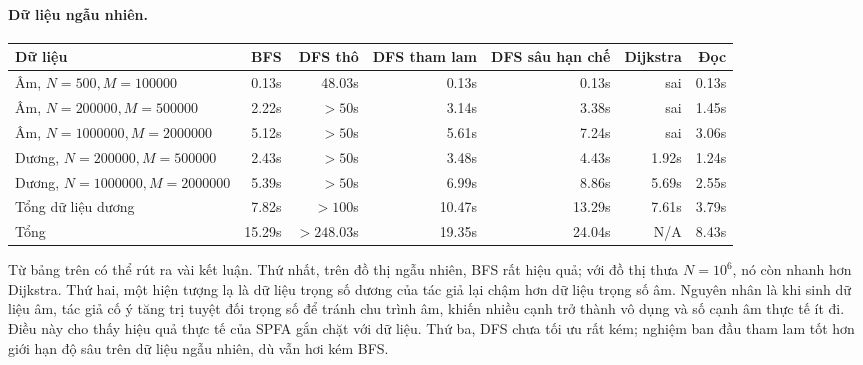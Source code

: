 \documentclass[11pt]{article}
\begin{document}
\paragraph{Dữ liệu ngẫu nhiên.}
\begin{center}
\scriptsize
\begin{tabular}{|l|r|r|r|r|r|r|}
\hline
Dữ liệu & BFS & DFS thô & DFS tham lam & DFS sâu hạn chế & Dijkstra & Đọc \\
\hline
Âm, \(N=500,M=100000\) & 0.13s & 48.03s & 0.13s & 0.13s & sai & 0.13s \\
Âm, \(N=200000,M=500000\) & 2.22s & \(>50\)s & 3.14s & 3.38s & sai & 1.45s \\
Âm, \(N=1000000,M=2000000\) & 5.12s & \(>50\)s & 5.61s & 7.24s & sai & 3.06s \\
Dương, \(N=200000,M=500000\) & 2.43s & \(>50\)s & 3.48s & 4.43s & 1.92s & 1.24s \\
Dương, \(N=1000000,M=2000000\) & 5.39s & \(>50\)s & 6.99s & 8.86s & 5.69s & 2.55s \\
Tổng dữ liệu dương & 7.82s & \(>100\)s & 10.47s & 13.29s & 7.61s & 3.79s \\
Tổng & 15.29s & \(>248.03\)s & 19.35s & 24.04s & N/A & 8.43s \\
\hline
\end{tabular}
\end{center}

Từ bảng trên có thể rút ra vài kết luận. Thứ nhất, trên đồ thị ngẫu nhiên,
BFS rất hiệu quả; với đồ thị thưa \(N=10^6\), nó còn nhanh hơn Dijkstra. Thứ
hai, một hiện tượng lạ là dữ liệu trọng số dương của tác giả lại chậm hơn dữ
liệu trọng số âm. Nguyên nhân là khi sinh dữ liệu âm, tác giả cố ý tăng trị
tuyệt đối trọng số để tránh chu trình âm, khiến nhiều cạnh trở thành vô dụng
và số cạnh âm thực tế ít đi. Điều này cho thấy hiệu quả thực tế của SPFA gắn
chặt với dữ liệu. Thứ ba, DFS chưa tối ưu rất kém; nghiệm ban đầu tham lam
tốt hơn giới hạn độ sâu trên dữ liệu ngẫu nhiên, dù vẫn hơi kém BFS.
\end{document}
